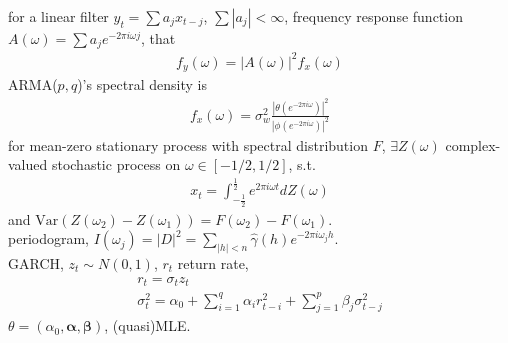 \documentclass[paper=a4, fontsize=11pt]{scrartcl} %
\numberwithin{equation}{section} %
\numberwithin{figure}{section} %
\numberwithin{table}{section} %
\def \var {\text{Var}}
\begin{document}
for a linear filter $y_t = \sum a_j x_{t-j}$, $\sum |a_j|<\infty$, frequency response function $A(\omega)=\sum a_j e^{-2\pi i\omega j}$, that
\begin{align}
	f_y(\omega) = |A(\omega)|^2 f_x(\omega)
\end{align}
ARMA($p,q$)'s spectral density is
\begin{align}
	f_x(\omega) = \sigma_w^2 \frac{|\theta(e^{-2\pi i \omega})|^2}{|\phi(e^{-2\pi i \omega})|^2}
\end{align}
for mean-zero stationary process with spectral distribution $F$, $\exists Z(\omega)$ complex-valued stochastic process on $\omega\in[-1/2,1/2]$, s.t.
\begin{align}
	x_t = \int_{-\frac{1}{2}}^{\frac{1}{2}} e^{2\pi i \omega t} dZ(\omega)
\end{align}
and $\var(Z(\omega_2) - Z(\omega_1)) = F(\omega_2)-F(\omega_1)$.\\
periodogram, $I(\omega_j)=|D|^2=\sum_{|h|<n}\widehat{\gamma}(h)e^{-2\pi i\omega_j h}$.\\
GARCH, $z_t\sim N(0,1)$, $r_t$ return rate,
\begin{align}
	r_t = \sigma_t z_t\\
	\sigma_t^2 = \alpha_0 +\sum_{i=1}^q \alpha_i r_{t-i}^2 + \sum_{j=1}^p \beta_j \sigma_{t-j}^2
\end{align}
$\theta=(\alpha_0,\bm{\alpha},\bm{\beta})$, (quasi)MLE.
\end{document}
